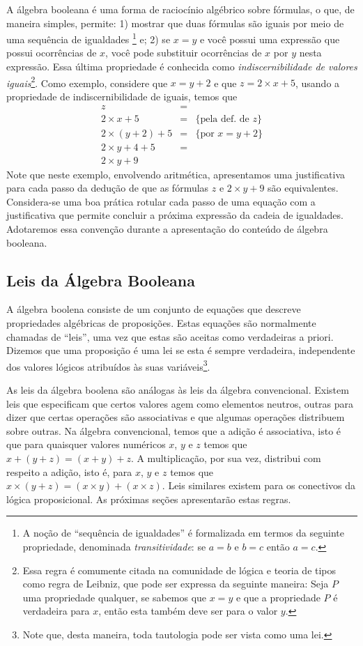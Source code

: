 A álgebra booleana é uma forma de raciocínio algébrico sobre
fórmulas, o que, de maneira simples, permite: 1) mostrar que duas
fórmulas são iguais por meio de uma sequência de igualdades \footnote{A
noção de ``sequência de igualdades'' é formalizada em termos da
seguinte propriedade, denominada \emph{transitividade}: se $a= b$ e $b
= c$ então $a = c$.} e; 2) se $x = y$ e você possui uma expressão que
possui ocorrências de $x$, você pode substituir ocorrências de
$x$ por $y$ nesta expressão. Essa última propriedade é conhecida como
\emph{indiscernibilidade de valores iguais}\footnote{Essa regra é
  comumente citada na comunidade de lógica e teoria de tipos como
  regra de Leibniz, que pode ser expressa da seguinte maneira: Seja
  $P$ uma propriedade qualquer, se sabemos que $x = y$ e que a
  propriedade $P$ é verdadeira para $x$, então esta também deve ser
  para o valor $y$.}. Como exemplo, considere
que $x = y + 2$ e que $z = 2 \times x + 5$, usando a propriedade de
indiscernibilidade de iguais, temos que
\[
\begin{array}{lcl}
z & = & \\
2 \times x + 5 & = & \{\text{pela def. de }z\}\\
2\times (y + 2)  + 5& = & \{\text{por }x = y + 2\}\\
2\times y + 4 + 5 & = & \\
2 \times y + 9
\end{array}
\]
Note que neste exemplo, envolvendo aritmética, apresentamos uma
justificativa para cada passo da dedução de que as fórmulas $z$ e
$2\times y + 9$ são equivalentes. Considera-se uma boa prática rotular
cada passo de uma equação com a justificativa que permite concluir a
próxima expressão da cadeia de igualdades. Adotaremos essa convenção
durante a apresentação do conteúdo de álgebra booleana.

\subsection{Leis da Álgebra Booleana}

A álgebra boolena consiste de um conjunto de equações que descreve
propriedades algébricas de proposições. Estas equações são normalmente
chamadas de ``leis'', uma vez que estas são aceitas como verdadeiras a
priori. Dizemos que uma proposição é uma lei se esta é sempre
verdadeira, independente dos valores lógicos atribuídos às suas
variáveis\footnote{Note que, desta maneira, toda tautologia pode ser
  vista como uma lei.}.

As leis da álgebra boolena são análogas às leis da álgebra
convencional. Existem leis que especificam que certos valores agem
como elementos neutros, outras para dizer que certas operações são
associativas e que algumas operações distribuem sobre outras. Na
álgebra convencional, temos que a adição é associativa, isto é que
para quaisquer valores numéricos $x$, $y$ e $z$ temos que $x + (y + z)
= (x + y) + z$. A multiplicação, por sua vez, distribui com respeito a
adição, isto é, para $x$, $y$ e $z$ temos que $x \times (y + z) = (x \times
y) + (x \times z)$.  Leis similares existem para os conectivos da
lógica proposicional. As próximas seções apresentarão estas regras.

